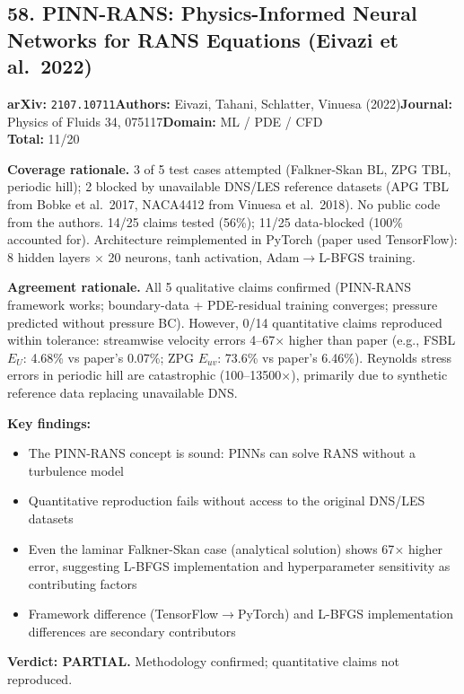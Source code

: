 \subsection{58. PINN-RANS: Physics-Informed Neural Networks for RANS Equations (Eivazi et al.\ 2022)}
\textbf{arXiv:} \texttt{2107.10711}\quad\textbf{Authors:} Eivazi, Tahani, Schlatter, Vinuesa (2022)\quad\textbf{Journal:} Physics of Fluids 34, 075117\quad\textbf{Domain:} ML / PDE / CFD\\
\quad{}\quad\textbf{Total:} 11/20\par\smallskip
\noindent\textbf{Coverage rationale.} 3 of 5 test cases attempted (Falkner-Skan BL, ZPG TBL, periodic hill); 2 blocked by unavailable DNS/LES reference datasets (APG TBL from Bobke et al.\ 2017, NACA4412 from Vinuesa et al.\ 2018). No public code from the authors. 14/25 claims tested (56\%); 11/25 data-blocked (100\% accounted for). Architecture reimplemented in PyTorch (paper used TensorFlow): 8 hidden layers $\times$ 20 neurons, tanh activation, Adam$\to$L-BFGS training.\par
\noindent\textbf{Agreement rationale.} All 5 qualitative claims confirmed (PINN-RANS framework works; boundary-data + PDE-residual training converges; pressure predicted without pressure BC). However, 0/14 quantitative claims reproduced within tolerance: streamwise velocity errors 4--67$\times$ higher than paper (e.g., FSBL $E_U$: 4.68\% vs paper's 0.07\%; ZPG $E_{uv}$: 73.6\% vs paper's 6.46\%). Reynolds stress errors in periodic hill are catastrophic (100--13500$\times$), primarily due to synthetic reference data replacing unavailable DNS.\par\smallskip
\noindent\textbf{Key findings:}
\begin{itemize}[leftmargin=1.4em,itemsep=0.2em,topsep=0.2em]
\item The PINN-RANS concept is sound: PINNs can solve RANS without a turbulence model
\item Quantitative reproduction fails without access to the original DNS/LES datasets
\item Even the laminar Falkner-Skan case (analytical solution) shows 67$\times$ higher error, suggesting L-BFGS implementation and hyperparameter sensitivity as contributing factors
\item Framework difference (TensorFlow$\to$PyTorch) and L-BFGS implementation differences are secondary contributors
\end{itemize}
\noindent\textbf{Verdict: PARTIAL.} Methodology confirmed; quantitative claims not reproduced.
